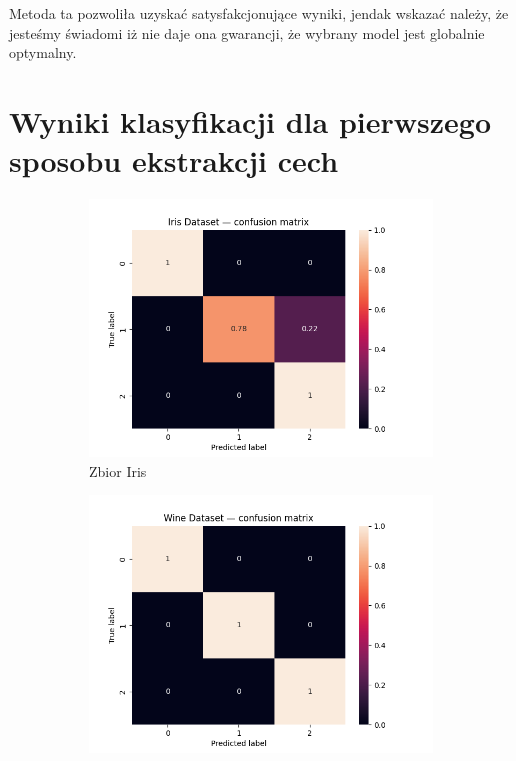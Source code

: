 \documentclass[12pt]{article}
\begin{document}
    Metoda ta pozwoliła uzyskać satysfakcjonujące wyniki, jendak wskazać należy, że jesteśmy świadomi iż nie daje ona gwarancji, że wybrany model jest globalnie optymalny.

    \pagebreak

    \section{Wyniki klasyfikacji dla pierwszego sposobu ekstrakcji cech}

    \begin{figure}[H]
        \centering
        \begin{subfigure}[t]{0.3\textwidth}
            \includegraphics[width=\linewidth]{img/iris_cm.png}
            \caption{Zbior Iris}
        \end{subfigure}
        \hfill
        \begin{subfigure}[t]{0.3\textwidth}
            \includegraphics[width=\linewidth]{img/wine_cm.png}

\end{subfigure}
\end{figure}
\end{document}
